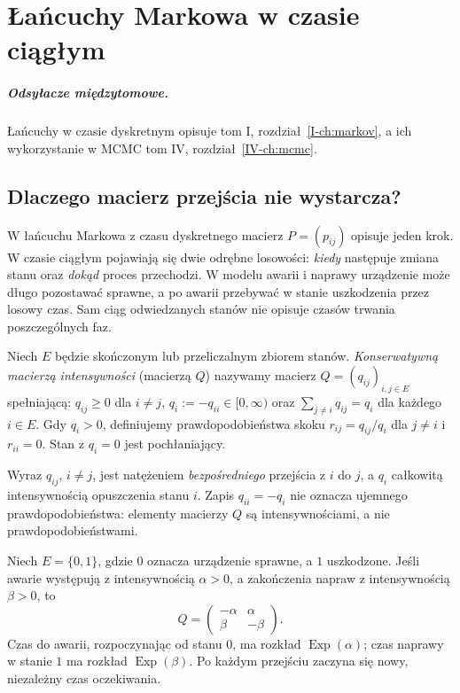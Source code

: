 \chapter{Łańcuchy Markowa w czasie ciągłym}
\label{ch:ctmc}
\paragraph{Odsyłacze międzytomowe.} Łańcuchy w czasie dyskretnym opisuje tom I, rozdział~\ref{I-ch:markov}, a ich wykorzystanie w MCMC tom IV, rozdział~\ref{IV-ch:mcmc}.


\section{Dlaczego macierz przejścia nie wystarcza?}
W łańcuchu Markowa z czasu dyskretnego macierz $P=(p_{ij})$
opisuje jeden krok. W czasie ciągłym pojawiają się dwie odrębne
losowości: \emph{kiedy} następuje zmiana stanu oraz \emph{dokąd}
proces przechodzi. W modelu awarii i naprawy urządzenie może długo
pozostawać sprawne, a po awarii przebywać w stanie uszkodzenia
przez losowy czas. Sam ciąg odwiedzanych stanów nie opisuje
czasów trwania poszczególnych faz.

\begin{definicja}
Niech $E$ będzie skończonym lub przeliczalnym zbiorem stanów.
\emph{Konserwatywną macierzą intensywności} (macierzą $Q$)
nazywamy macierz $Q=(q_{ij})_{i,j\in E}$ spełniającą:
$q_{ij}\ge0$ dla $i\ne j$, $q_i:=-q_{ii}\in[0,\infty)$
oraz $\sum_{j\ne i}q_{ij}=q_i$ dla każdego $i\in E$.
Gdy $q_i>0$, definiujemy prawdopodobieństwa skoku
$r_{ij}=q_{ij}/q_i$ dla $j\ne i$ i $r_{ii}=0$.
Stan z $q_i=0$ jest pochłaniający.
\end{definicja}

Wyraz $q_{ij}$, $i\ne j$, jest natężeniem \emph{bezpośredniego}
przejścia z $i$ do $j$, a $q_i$ całkowitą intensywnością
opuszczenia stanu $i$. Zapis $q_{ii}=-q_i$ nie oznacza
ujemnego prawdopodobieństwa: elementy macierzy $Q$ są
intensywnościami, a nie prawdopodobieństwami.

\begin{przyklad}
Niech $E=\{0,1\}$, gdzie $0$ oznacza urządzenie sprawne,
a $1$ uszkodzone. Jeśli awarie występują z intensywnością
$\alpha>0$, a zakończenia napraw z intensywnością $\beta>0$,
to
\[
Q=\begin{pmatrix}-\alpha&\alpha\\\beta&-\beta\end{pmatrix}.
\]
Czas do awarii, rozpoczynając od stanu $0$, ma rozkład
$\operatorname{Exp}(\alpha)$; czas naprawy w stanie $1$
ma rozkład $\operatorname{Exp}(\beta)$. Po każdym przejściu
zaczyna się nowy, niezależny czas oczekiwania.
\end{przyklad}

